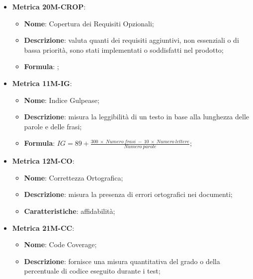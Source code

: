 \begin{itemize}
    \item \textbf{Metrica 20M-CROP}:
    \begin{itemize}
        \item \textbf{Nome}: Copertura dei Requisiti Opzionali;
        \item \textbf{Descrizione}: valuta quanti dei requisiti aggiuntivi, non essenziali o di bassa priorità, sono stati implementati o soddisfatti nel prodotto;
        \item \textbf{Formula}: ;
    \end{itemize}
\end{itemize}

\begin{itemize}
    \item \textbf{Metrica 11M-IG}:
    \begin{itemize}
        \item \textbf{Nome}: Indice Gulpease;
        \item \textbf{Descrizione}: misura la leggibilità di un testo in base alla lunghezza delle parole e delle frasi;
        \item \textbf{Formula}: $IG = 89 + \frac{300 \:\times \:Numero\:frasi \:- \:10 \:\times\: Numero\:lettere}{Numero\:parole}$;
    \end{itemize}
\end{itemize}

\begin{itemize}
    \item \textbf{Metrica 12M-CO}:
    \begin{itemize}
        \item \textbf{Nome}: Correttezza Ortografica;
        \item \textbf{Descrizione}: misura la presenza di errori ortografici nei documenti;
        \item \textbf{Caratteristiche}: affidabilità;
    \end{itemize}
\end{itemize}

\begin{itemize}
    \item \textbf{Metrica 21M-CC}:
    \begin{itemize}
        \item \textbf{Nome}: Code Coverage;
        \item \textbf{Descrizione}: fornisce una misura quantitativa del grado o della percentuale di codice eseguito durante i test;
    \end{itemize}
\end{itemize}

